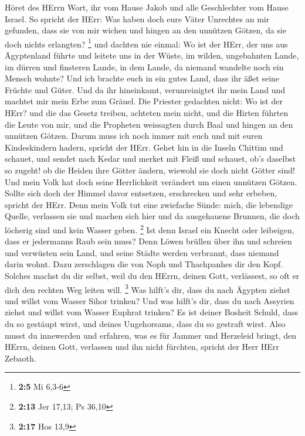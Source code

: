  Höret des HErrn Wort, ihr vom Hause Jakob und alle
Geschlechter vom Hause Israel.  So spricht der HErr: Was
haben doch eure Väter Unrechtes an mir gefunden, dass sie von mir wichen
und hingen an den unnützen Götzen, da sie doch nichts erlangten?
\footnote{\textbf{2:5} Mi 6,3-6}  und dachten nie einmal: Wo
ist der HErr, der uns aus Ägyptenland führte und leitete uns in der
Wüste, im wilden, ungebahnten Lande, im dürren und finsteren Lande, in
dem Lande, da niemand wandelte noch ein Mensch wohnte?  Und
ich brachte euch in ein gutes Land, dass ihr äßet seine Früchte und
Güter. Und da ihr hineinkamt, verunreinigtet ihr mein Land und machtet
mir mein Erbe zum Gräuel.  Die Priester gedachten nicht: Wo
ist der HErr? und die das Gesetz treiben, achteten mein nicht, und die
Hirten führten die Leute von mir, und die Propheten weissagten durch
Baal und hingen an den unnützen Götzen.  Darum muss ich noch
immer mit euch und mit euren Kindeskindern hadern, spricht der HErr.
 Gehet hin in die Inseln Chittim und schauet, und sendet
nach Kedar und merket mit Fleiß und schauet, ob's daselbst so zugeht!
 ob die Heiden ihre Götter ändern, wiewohl sie doch nicht
Götter sind! Und mein Volk hat doch seine Herrlichkeit verändert um
einen unnützen Götzen.  Sollte sich doch der Himmel davor
entsetzen, erschrecken und sehr erbeben, spricht der HErr. 
Denn mein Volk tut eine zwiefache Sünde: mich, die lebendige Quelle,
verlassen sie und machen sich hier und da ausgehauene Brunnen, die doch
löcherig sind und kein Wasser geben. \footnote{\textbf{2:13} Jer 17,13;
  Ps 36,10}  Ist denn Israel ein Knecht oder leibeigen,
dass er jedermanns Raub sein muss?  Denn Löwen brüllen über
ihn und schreien und verwüsten sein Land, und seine Städte werden
verbrannt, dass niemand darin wohnt.  Dazu zerschlagen die
von Noph und Thachpanhes dir den Kopf.  Solches machst du
dir selbst, weil du den HErrn, deinen Gott, verlässest, so oft er dich
den rechten Weg leiten will. \footnote{\textbf{2:17} Hos 13,9}
 Was hilft's dir, dass du nach Ägypten ziehst und willst
vom Wasser Sihor trinken? Und was hilft's dir, dass du nach Assyrien
ziehst und willst vom Wasser Euphrat trinken?  Es ist
deiner Bosheit Schuld, dass du so gestäupt wirst, und deines
Ungehorsams, dass du so gestraft wirst. Also musst du innewerden und
erfahren, was es für Jammer und Herzeleid bringt, den HErrn, deinen
Gott, verlassen und ihn nicht fürchten, spricht der Herr HErr Zebaoth.
